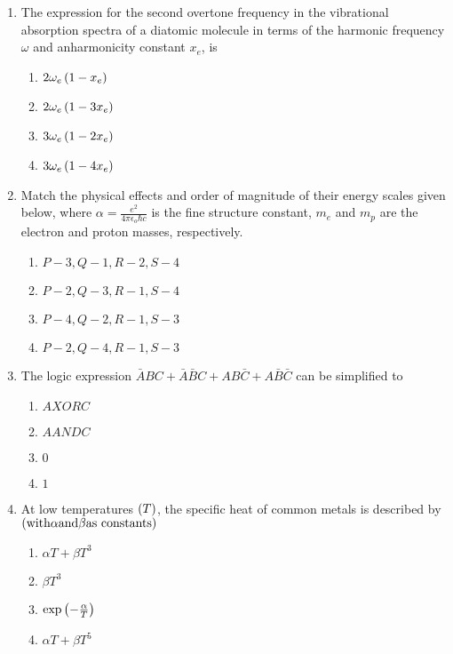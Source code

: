 \documentclass[journal,12pt,twocolumn]{IEEEtran}
\theoremstyle{remark}
\begin{document}
\begin{enumerate}[start=1]
\item The expression for the second overtone frequency in the vibrational absorption spectra of a diatomic molecule in terms of the harmonic frequency $\omega$ and anharmonicity constant $x_e$, is
\begin{enumerate}
    \item $2 \omega_e \left(1 - x_e\right)$
    \item $2 \omega_e \left(1 - 3x_e\right)$
    \item $3 \omega_e \left(1 - 2x_e\right)$
    \item $3 \omega_e \left(1 - 4x_e\right)$
\end{enumerate}

\item Match the physical effects and order of magnitude of their energy scales given below, where $\alpha=\frac{e^2}{4\pi\epsilon_o\hbar c}$ is the fine structure constant, $m_e$ and $m_p$ are the electron and proton masses, respectively.


\begin{enumerate}
    \item $P-3, Q-1, R-2, S-4$
    \item $P-2, Q-3, R-1, S-4$
    \item $P-4, Q-2, R-1, S-3$
    \item $P-2, Q-4, R-1, S-3$
\end{enumerate}

\item The logic expression $\bar{A}BC + \bar{A}\bar{B}C + AB\bar{C} + A\bar{B}\bar{C}$ can be simplified to
\begin{enumerate}
    \item $A XOR C$
    \item $A AND C$
    \item $0$
    \item $1$
\end{enumerate}

\item At low temperatures $\left(T\right)$, the specific heat of common metals is described by $\left(\text{with} \alpha \text{and} \beta \text{as constants}\right)$
\begin{enumerate}
    \item $\alpha T + \beta T^3$
    \item $\beta T^3$
    \item $\exp\left(-\frac{\alpha}{T}\right)$
    \item $\alpha T + \beta T^5$
\end{enumerate}


\end{enumerate}
\end{document}
